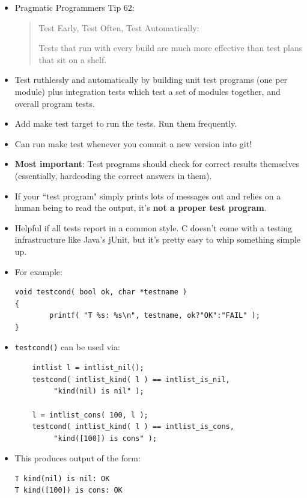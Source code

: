 \documentclass[aspectratio=169]{beamer}
\newcommand{\pitem}{\pause \item}
\begin{document}
\begin{frame}[fragile]
    \begin{itemize}
      \item
	Pragmatic Programmers Tip 62:
\begin{quote}
Test Early, Test Often, Test Automatically:

Tests that run with every build are much more
effective than test plans that sit on a shelf.
\end{quote}
    \pause
    \item
      Test \alert{ruthlessly} and \alert{automatically}
      by building \alert{unit test} programs (one per module) plus
      \alert{integration} tests which test a set of modules together,
      and \alert{overall} program tests.
    \item
      Add \alert{make test} target to run the tests.
      Run them frequently.
    \item
      Can run \alert{make test}
      whenever you commit a new version into git!
    \pitem
      {\bf Most important}:
      Test programs should check for correct results themselves
      (essentially, hardcoding the correct answers in them).
    \pitem
      If your ``test program" simply prints lots of messages out
      and relies on a human being to read the output, it's
      {\bf not a proper test program}.

    \pitem
      Helpful if all tests report in a common style.
      C doesn't come with a testing infrastructure like Java's jUnit,
      but it's pretty easy to whip something simple up.
    \end{itemize}
\end{frame}

\begin{frame}[fragile]
    \begin{itemize}
      \item
      For example:

{\small
\begin{verbatim}
void testcond( bool ok, char *testname )
{
        printf( "T %s: %s\n", testname, ok?"OK":"FAIL" );
}
\end{verbatim}
}
	\item
	\verb+testcond()+ can be used via:

{\small
\begin{verbatim}
	intlist l = intlist_nil();
	testcond( intlist_kind( l ) == intlist_is_nil,
	     "kind(nil) is nil" );

	l = intlist_cons( 100, l );
	testcond( intlist_kind( l ) == intlist_is_cons,
	     "kind([100]) is cons" );
\end{verbatim}
}

      \item
      This produces output of the form:
{\small
\begin{verbatim}
T kind(nil) is nil: OK
T kind([100]) is cons: OK
\end{verbatim}
}

    \end{itemize}
\end{frame}
\end{document}
